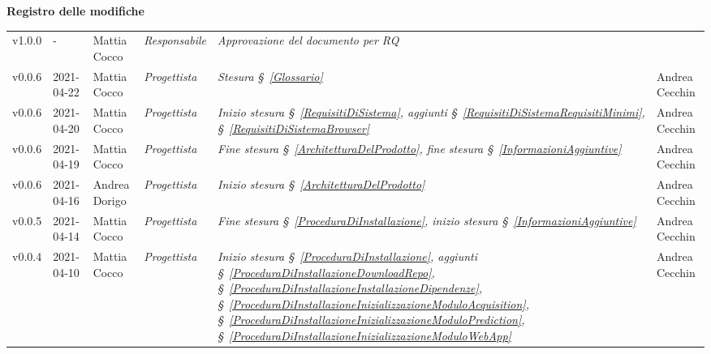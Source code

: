 \quad
\begin{center}
	\LARGE\textbf{Registro delle modifiche}
\end{center}
\def\tabularxcolumn#1{m{#1}}
{

\begin{center}
	\renewcommand{\arraystretch}{1.4}
	\begin{longtable}[c]{|p{2cm-1\tabcolsep}|p{2cm}|p{3cm-2\tabcolsep}|p{3cm-1.5\tabcolsep}|p{}|p{4cm-2\tabcolsep}|}
		\hline
		\rowcolor{airforceblue}
		\makecell[c]{\textbf{Versione}} & \makecell[c]{\textbf{Data}} & \makecell[c]{\textbf{Autore}} & \makecell[c]{\textbf{Ruolo}} & \makecell[c]{\textbf{Modifica}} &  \makecell[c]{\textbf{Verificatore}}\\
		\hline
		\centering v1.0.0 & - & Mattia Cocco & \centering \textit{Responsabile} & \textit{Approvazione del documento per RQ}  & \makecell[c]{-}\\
		\hline
		\hline
		\centering v0.0.6 & 2021-04-22 & Mattia Cocco & \centering \textit{Progettista} & \textit{Stesura \S~\ref{Glossario}} & Andrea Cecchin\\
		\hline
		\hline
		\centering v0.0.6 & 2021-04-20 & Mattia Cocco & \centering \textit{Progettista} & \textit{Inizio stesura \S~\ref{RequisitiDiSistema}, aggiunti \S~\ref{RequisitiDiSistemaRequisitiMinimi}, \S~\ref{RequisitiDiSistemaBrowser}} & Andrea Cecchin\\
		\hline
		\hline
		\centering v0.0.6 & 2021-04-19 & Mattia Cocco & \centering \textit{Progettista} & \textit{Fine stesura \S~\ref{ArchitetturaDelProdotto}, fine stesura \S~\ref{InformazioniAggiuntive}} & Andrea Cecchin\\
		\hline
		\hline
		\centering v0.0.6 & 2021-04-16 & Andrea Dorigo & \centering \textit{Progettista} & \textit{Inizio stesura \S~\ref{ArchitetturaDelProdotto}} & Andrea Cecchin\\
		\hline
		\hline
		\centering v0.0.5 & 2021-04-14 & Mattia Cocco & \centering \textit{Progettista} & \textit{Fine stesura \S~\ref{ProceduraDiInstallazione}, inizio stesura \S~\ref{InformazioniAggiuntive}} & Andrea Cecchin \\
		\hline
		\hline
		\centering v0.0.4 & 2021-04-10 & Mattia Cocco & \centering \textit{Progettista} & \textit{Inizio stesura \S~\ref{ProceduraDiInstallazione}, aggiunti
		\S~\ref{ProceduraDiInstallazioneDownloadRepo}, \S~\ref{ProceduraDiInstallazioneInstallazioneDipendenze},
		\S~\ref{ProceduraDiInstallazioneInizializzazioneModuloAcquisition}, \S~\ref{ProceduraDiInstallazioneInizializzazioneModuloPrediction}, \S~\ref{ProceduraDiInstallazioneInizializzazioneModuloWebApp}} & Andrea Cecchin \\

\end{longtable}
\end{center}}
